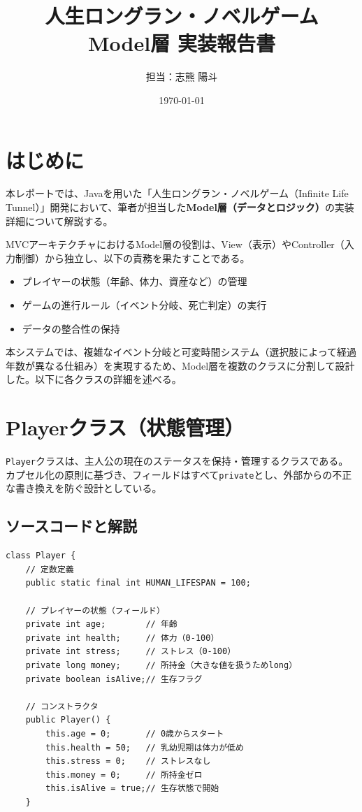\documentclass[a4paper,11pt]{jsarticle}
\title{人生ロングラン・ノベルゲーム\\Model層 実装報告書}
\author{担当：志熊 陽斗}
\date{\today}
\begin{document}
\maketitle

\section{はじめに}
本レポートでは、Javaを用いた「人生ロングラン・ノベルゲーム（Infinite Life Tunnel）」開発において、筆者が担当した\textbf{Model層（データとロジック）}の実装詳細について解説する。

MVCアーキテクチャにおけるModel層の役割は、View（表示）やController（入力制御）から独立し、以下の責務を果たすことである。
\begin{itemize}
    \item プレイヤーの状態（年齢、体力、資産など）の管理
    \item ゲームの進行ルール（イベント分岐、死亡判定）の実行
    \item データの整合性の保持
\end{itemize}

本システムでは、複雑なイベント分岐と可変時間システム（選択肢によって経過年数が異なる仕組み）を実現するため、Model層を複数のクラスに分割して設計した。以下に各クラスの詳細を述べる。

\section{Playerクラス（状態管理）}
\texttt{Player}クラスは、主人公の現在のステータスを保持・管理するクラスである。
カプセル化の原則に基づき、フィールドはすべて\texttt{private}とし、外部からの不正な書き換えを防ぐ設計としている。

\subsection{ソースコードと解説}

\begin{lstlisting}[caption=Player.java（定数とフィールド定義）, label=code:player_fields]
class Player {
    // 定数定義
    public static final int HUMAN_LIFESPAN = 100;

    // プレイヤーの状態（フィールド）
    private int age;        // 年齢
    private int health;     // 体力（0-100）
    private int stress;     // ストレス（0-100）
    private long money;     // 所持金（大きな値を扱うためlong）
    private boolean isAlive;// 生存フラグ

    // コンストラクタ
    public Player() {
        this.age = 0;       // 0歳からスタート
        this.health = 50;   // 乳幼児期は体力が低め
        this.stress = 0;    // ストレスなし
        this.money = 0;     // 所持金ゼロ
        this.isAlive = true;// 生存状態で開始
    }
\end{lstlisting}
\end{document}
